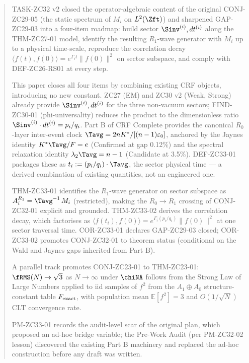 \documentclass[12pt, a4paper]{article}
\begin{document}
\begin{abstract}

TASK-ZC32 v2 closed the operator-algebraic content of the original
CONJ-ZC29-05 (the static spectrum of $M_i$ on $L^2(\Zft)$) and
sharpened GAP-ZC29-03 into a four-item roadmap: build sector
$\Sinv^{(i)}, dt^{(i)}$ along the THM-ZC27-01 model, identify the
resulting $R_1$-wave generator with $M_i$ up to a physical
time-scale, reproduce the correlation decay
$\langle f(t), f(0)\rangle = e^{\Gamma_i t}\|f(0)\|^2$ on sector
subspace, and comply with DEF-ZC26-RS01 at every step.

This paper closes all four items by combining existing CRF
objects, introducing no new constant. ZC27 (EM) and ZC30 v2
(Weak, Strong) already provide $\Sinv^{(i)}, dt^{(i)}$ for the
three non-vacuum sectors; FIND-ZC30-01 (phi-universality)
reduces the product to the dimensionless ratio
$\Sinv^{(i)}\cdot dt^{(i)} = p_i/q_i$. Part B of CRF Complete
provides the canonical $R_0$-layer inter-event clock
$\Tavg = 2nK^*/[(n-1)\varepsilon_0]$, anchored by the Jaynes
identity $K^*\Tavg/F = e$ (Confirmed at gap 0.12\%) and the
spectral relaxation identity $\lambda_2 \Tavg = n-1$
(Candidate at 3.5\%). DEF-ZC33-01 packages these as
$t_i := (p_i/q_i)\cdot\Tavg$, the sector physical time --- a
derived combination of existing quantities, not an engineered
one.

THM-ZC33-01 identifies the $R_1$-wave generator on sector
subspace as $A_i^{R_1} = \Tavg^{-1}\,M_i$ (restricted),
making the $R_0\to R_1$ crossing of CONJ-ZC32-01 explicit
and grounded. THM-ZC33-02 derives the correlation decay,
which factorises as $\langle f(t_i), f(0)\rangle =
e^{\Gamma_i (p_i/q_i)}\|f(0)\|^2$ at one sector traversal time.
COR-ZC33-01 declares GAP-ZC29-03 closed; COR-ZC33-02 promotes
CONJ-ZC32-01 to theorem status (conditional on the Wald and
Jaynes gaps inherited from Part B).

A parallel track promotes CONJ-ZC23-01 to THM-ZC23-01:
$\fRMS(N)\to\sqrt{3}$ as $N\to\infty$ under $\chiNA$ follows
from the Strong Law of Large Numbers applied to iid samples
of $f^2$ from the $A_1\oplus A_0$ structure-constant table
$F_{\rm exact}$, with population mean $\mathbb{E}[f^2] = 3$
and $O(1/\sqrt{N})$ CLT convergence rate.

PM-ZC33-01 records the audit-level scar of the original plan,
which proposed an ad-hoc bridge variable; the Pre-Work Audit
(per PM-ZC32-02 lesson) discovered the existing Part B
machinery and replaced the ad-hoc construction before any
draft was written.

\end{abstract}
\end{document}
